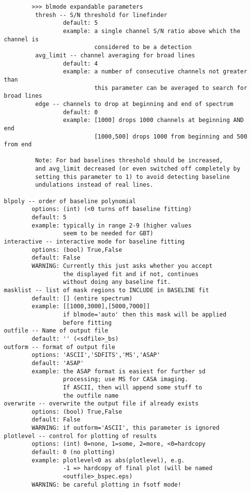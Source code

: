\begin{verbatim}
        >>> blmode expandable parameters
         thresh -- S/N threshold for linefinder
                 default: 5
                 example: a single channel S/N ratio above which the channel is
                          considered to be a detection
         avg_limit -- channel averaging for broad lines
                 default: 4
                 example: a number of consecutive channels not greater than
                          this parameter can be averaged to search for broad lines
         edge -- channels to drop at beginning and end of spectrum
                 default: 0
                 example: [1000] drops 1000 channels at beginning AND end
                          [1000,500] drops 1000 from beginning and 500 from end

         Note: For bad baselines threshold should be increased,
         and avg_limit decreased (or even switched off completely by
         setting this parameter to 1) to avoid detecting baseline
         undulations instead of real lines.

blpoly -- order of baseline polynomial
        options: (int) (<0 turns off baseline fitting)
        default: 5
        example: typically in range 2-9 (higher values
                 seem to be needed for GBT)
interactive -- interactive mode for baseline fitting
        options: (bool) True,False
        default: False
        WARNING: Currently this just asks whether you accept
                 the displayed fit and if not, continues
                 without doing any baseline fit.
masklist -- list of mask regions to INCLUDE in BASELINE fit
        default: [] (entire spectrum)
        example: [[1000,3000],[5000,7000]]
                 if blmode='auto' then this mask will be applied
                 before fitting
outfile -- Name of output file
        default: '' (<sdfile>_bs)
outform -- format of output file
        options: 'ASCII','SDFITS','MS','ASAP'
        default: 'ASAP'
        example: the ASAP format is easiest for further sd
                 processing; use MS for CASA imaging.
                 If ASCII, then will append some stuff to
                 the outfile name
overwrite -- overwrite the output file if already exists
        options: (bool) True,False
        default: False
        WARNING: if outform='ASCII', this parameter is ignored
plotlevel -- control for plotting of results
        options: (int) 0=none, 1=some, 2=more, <0=hardcopy
        default: 0 (no plotting)
        example: plotlevel<0 as abs(plotlevel), e.g.
                 -1 => hardcopy of final plot (will be named
                 <outfile>_bspec.eps)
        WARNING: be careful plotting in fsotf mode!
\end{verbatim}

